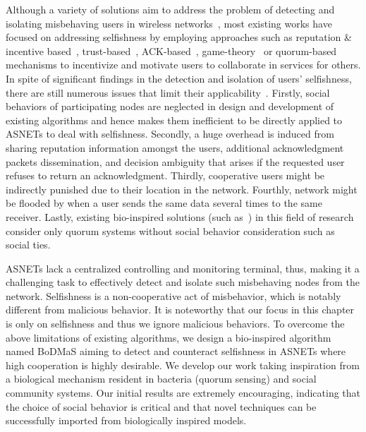 Although a variety of solutions aim to address the problem of detecting and isolating misbehaving users in wireless networks~\cite{JChoi2011}, most existing works have focused on addressing selfishness by employing approaches such as reputation \& incentive based~\cite{MTRefaei2010}, trust-based~\cite{UVenkanna2013}, ACK-based~\cite{NKang2010}, game-theory~\cite{KAkkarajitsakul2013} or quorum-based~\cite{EMannes2012} mechanisms to incentivize and motivate users to collaborate in services for others. In spite of significant findings in the detection and isolation of users' selfishness, there are still numerous issues that limit their applicability~\cite{SDjahel2011}. Firstly, social behaviors of participating nodes are neglected in design and development of existing algorithms and hence makes them inefficient to be directly applied to ASNETs to deal with selfishness. Secondly, a huge overhead is induced from sharing reputation information amongst the users, additional acknowledgment packets dissemination, and decision ambiguity that arises if the requested user refuses to return an acknowledgment. Thirdly, cooperative users might be indirectly punished due to their location in the network. Fourthly, network might be flooded by when a user sends the same data several times to the same receiver. Lastly, existing bio-inspired solutions (such as~\cite{EMannes2012}) in this field of research consider only quorum systems without social behavior consideration such as social ties.

ASNETs lack a centralized controlling and monitoring terminal, thus, making it a challenging task to  effectively detect and isolate such misbehaving nodes from the network. Selfishness is a non-cooperative act of misbehavior, which is notably different from malicious behavior. It is noteworthy that our focus in this chapter is only on selfishness and thus we ignore malicious behaviors. To overcome the above limitations of existing algorithms, we design a bio-inspired algorithm named BoDMaS aiming to detect and counteract selfishness in ASNETs where high cooperation is highly desirable. We develop our work taking inspiration from a biological mechanism resident in bacteria (quorum sensing) and social community systems. Our initial results are extremely encouraging, indicating that the choice of social behavior is critical and that novel techniques can be successfully imported from biologically inspired models.

